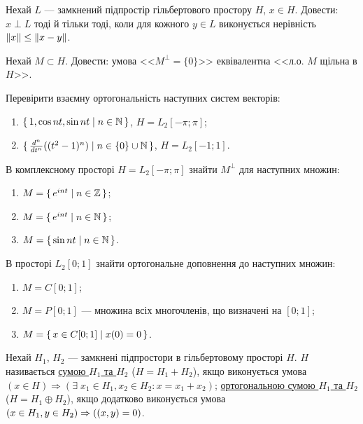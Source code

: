 \begin{exercise}
    Нехай $L$ --- замкнений підпростір гільбертового простору $H$, $x \in H$. Довести:
    $x \perp L$ тоді й тільки тоді, коли для кожного $y \in L$ виконується нерівність $\left\lVert x\right\rVert \leq \left\lVert x-y\right\rVert$.
\end{exercise}

\begin{exercise}
    Нехай $M \subset H$. Довести: умова <<$M^\perp = \{0\}$>> еквівалентна <<$\text{л.о. } M$ щільна в $H$>>.
\end{exercise}

\begin{exercise}
    Перевірити взаємну ортогональність наступних систем векторів:
    \begin{enumerate}[label=\ukr*)]
        \item $\set{1, \cos{nt}, \sin{nt} \mid n \in \mathbb{N}}$, $H = L_2 [-\pi; \pi]$;
        \item $\set{\frac{d^n}{dt^n} ((t^2-1)^n) \mid n \in \{0 \} \cup \mathbb{N}}$, $H = L_2 [-1; 1]$.
    \end{enumerate}
\end{exercise}

\begin{exercise}\label{N:1_2_14}
    В комплексному просторі $H = L_2 [-\pi; \pi]$ знайти $M^\perp$ для наступних множин:
    \begin{enumerate}[label=\ukr*)]
        \item $M = \set{e^{i n t} \mid n \in \mathbb{Z}}$;
        \item $M = \set{e^{i n t} \mid n \in \mathbb{N}}$;
        \item $M = \set{\sin{n t} \mid n \in \mathbb{N}}$.
    \end{enumerate}
\end{exercise}

\begin{exercise}
    В просторі $L_2 [0; 1]$ знайти ортогональне доповнення до наступних множин:
    \begin{enumerate}[label=\ukr*)]
        \item $M = C[0; 1]$;
        \item $M = P[0;1]$ --- множина всіх многочленів, що визначені на $[0; 1]$;
        \item $M = \set{ x \in C[0;1] \mid x(0) = 0}$.
    \end{enumerate}
\end{exercise}

\begin{theory}
    Нехай $H_1$, $H_2$ --- замкнені підпростори в гільбертовому просторі $H$.
    $H$ називається \uline{сумою $H_1$ та $H_2$} ($H = H_1 + H_2$), якщо виконується умова
    $(x \in H) \Rightarrow (\exists \; x_1 \in H_1, x_2 \in H_2 : x = x_1 + x_2)$;
    \uline{ортогональною сумою $H_1$ та $H_2$} ($H = H_1 \oplus H_2$), якщо додатково виконується умова
    $(x \in H_1, y \in H_2) \Rightarrow ( \left(x, y\right) = 0)$.
\end{theory}